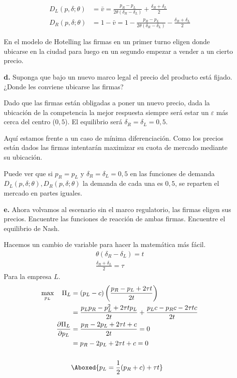 \documentclass{exam}
\begin{document}
\begin{enumerate}
\begin{solution}
\begin{align*}
    D_L(p,\delta;\theta) &= \bar{v} = \frac{p_R-p_L}{2\theta (\delta_R-\delta_L)} + \frac{\delta_R + \delta_L}{2} \\
    D_R(p,\delta;\theta) &= 1 - \bar{v} = 1 -  \frac{p_R-p_L}{2\theta (\delta_R-\delta_L)} - \frac{\delta_R + \delta_L}{2} 
\end{align*}
    \end{solution}
    En el modelo de Hotelling las firmas en un primer turno eligen donde ubicarse en la ciudad para luego en un segundo empezar a vender a un cierto precio. 
    \item[\textbf{d.}] Suponga que bajo un nuevo marco legal el precio del producto está fijado. ¿Donde les conviene ubicarse las firmas?
    \begin{solution}
        Dado que las firmas están obligadas a poner un nuevo precio, dada la ubicación de la competencia la mejor respuesta siempre será estar un $\varepsilon$ más cerca del centro ($0,5$). El equilibrio será $\delta_R = \delta_L = 0,5$.

        Aquí estamos frente a un caso de mínima diferenciación. Como los precios están dados las firmas intentarán maximizar su cuota de mercado mediante su ubicación. 

        Puede ver que si $p_R = p_L $ y $\delta_R = \delta_L = 0,5$ en las funciones de demanda $D_L(p,\delta;\theta),D_R(p,\delta;\theta)$ la demanda de cada una es $0,5$, se reparten el mercado en partes iguales.
    \end{solution}
    \item[\textbf{e.}] Ahora volvamos al escenario sin el marco regulatorio, las firmas eligen sus precios. Encuentre las funciones de reacción de ambas firmas. Encuentre el equilibrio de Nash.
    \begin{solution}
        Hacemos un cambio de variable para hacer la matemática más fácil.
\begin{align*}
    \theta(\delta_R-\delta_L) = t \\
    \frac{\delta_R+\delta_L}{2} = \tau
\end{align*}
Para la empresa $L$.
\begin{align*}
    \max_{p_L} \quad \Pi_L &= (p_L - c) \left( 
 \frac{p_R-p_L+2\tau t}{2t}  \right) \\
    & = \frac{p_Lp_R - p_L^2 +2\tau tp_L}{2t} + \frac{p_Lc-p_Rc-2\tau t c}{2t} \\
    \frac{\partial \Pi_L}{\partial p_L} & = \frac{p_R-2p_L+2\tau t +c}{2t} = 0 \\
    & = p_R -2p_L+2\tau t +c = 0 \\
    & \quad \\
    & \Aboxed{p_L = \frac{1}{2} (p_R + c) + \tau t}
\end{align*}


\end{solution}
\end{enumerate}
\end{document}
